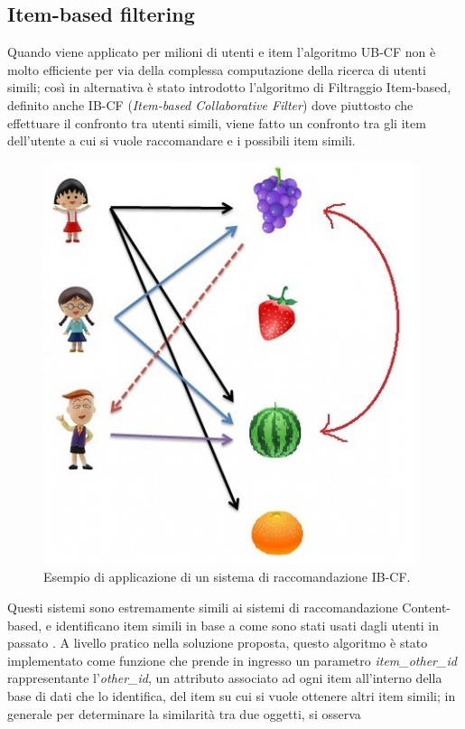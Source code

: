 \subsection{Item-based filtering}
Quando viene applicato per milioni di utenti e item l'algoritmo UB-CF non è molto efficiente per via della complessa computazione della 
ricerca di utenti simili; così in alternativa è stato introdotto l'algoritmo di Filtraggio Item-based, definito anche IB-CF 
(\textit{Item-based Collaborative Filter}) dove piuttosto che effettuare il confronto tra utenti simili, viene fatto un confronto tra 
gli item dell'utente a cui si vuole raccomandare e i possibili item simili.
%
\begin{figure}[ht!]
    \centering
    \includegraphics[scale=0.5]{images/IB_CF_ex.png}
    \caption{Esempio di applicazione di un sistema di raccomandazione IB-CF.}
    \label{fig:IB_CF}
\end{figure}
\hfill\break
Questi sistemi sono estremamente simili ai sistemi di raccomandazione Content-based, e identificano item simili in base a come sono 
stati usati dagli utenti in passato \cite{item-based-collaborative-filtering}.\hfill\break
A livello pratico nella soluzione proposta, questo algoritmo è stato implementato come funzione che prende in ingresso un 
parametro \textit{item\_other\_id} rappresentante l'\textit{other\_id}, un attributo associato ad ogni item all'interno della base di dati 
che lo identifica, del item su cui si vuole ottenere altri item simili; in generale per determinare la similarità tra due oggetti, si osserva 
